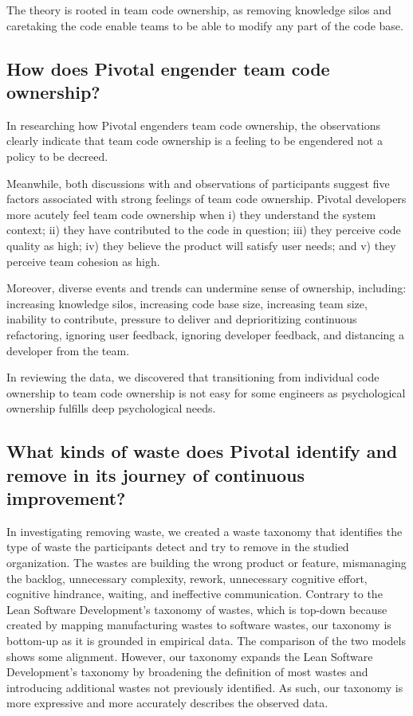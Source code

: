 The theory is rooted in team code ownership, as removing knowledge silos and caretaking the code enable teams to be able to modify any part of the code base. 


\subsection{How does Pivotal engender team code ownership?}
In researching how Pivotal engenders team code ownership, the observations clearly indicate that team code ownership is a feeling to be engendered not a policy to be decreed.


Meanwhile, both discussions with and observations of participants suggest five factors associated with strong feelings of team code ownership. Pivotal developers more acutely feel team code ownership when i) they understand the system context; ii) they have contributed to the code in question; iii) they perceive code quality as high; iv) they believe the product will satisfy user needs; and v) they perceive team cohesion as high.


Moreover, diverse events and trends can undermine sense of ownership, including: increasing knowledge silos, increasing code base size, increasing team size, inability to contribute, pressure to deliver and deprioritizing continuous refactoring, ignoring user feedback, ignoring developer feedback, and distancing a developer from the team.


In reviewing the data, we discovered that transitioning from individual code ownership to team code ownership is not easy for some engineers as psychological ownership fulfills deep psychological needs.


\subsection{What kinds of waste does Pivotal identify and remove in its journey of continuous improvement? }


In investigating removing waste, we created a waste taxonomy that identifies the type of waste the participants detect and try to remove in the studied organization. The wastes are building the wrong product or feature, mismanaging the backlog, unnecessary complexity, rework, unnecessary cognitive effort, cognitive hindrance, waiting, and ineffective communication. 
Contrary to the Lean Software Development's taxonomy of wastes, which is top-down because created by mapping manufacturing wastes to software wastes, our taxonomy is bottom-up as it is grounded in empirical data. The comparison of the two models shows some alignment. However, our taxonomy expands the Lean Software Development's taxonomy by broadening the definition of most wastes and introducing additional wastes not previously identified. As such, our taxonomy is more expressive and more accurately describes the observed data.


